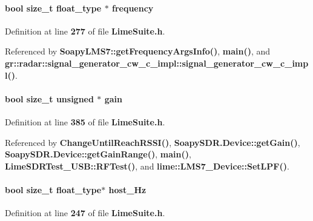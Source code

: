 \paragraph[{frequency}]{\setlength{\rightskip}{0pt plus 5cm}bool size\+\_\+t {\bf float\+\_\+type} $\ast$ frequency}\label{group__FN__HIGH__LVL_ga0d6d2a17845b8d678835c742f5eb6ac4}


Definition at line {\bf 277} of file {\bf Lime\+Suite.\+h}.



Referenced by {\bf Soapy\+L\+M\+S7\+::get\+Frequency\+Args\+Info()}, {\bf main()}, and {\bf gr\+::radar\+::signal\+\_\+generator\+\_\+cw\+\_\+c\+\_\+impl\+::signal\+\_\+generator\+\_\+cw\+\_\+c\+\_\+impl()}.

\paragraph[{gain}]{\setlength{\rightskip}{0pt plus 5cm}bool size\+\_\+t unsigned $\ast$ gain}\label{group__FN__HIGH__LVL_ga1275acc2013b13f44e8d43fcde951ef1}


Definition at line {\bf 385} of file {\bf Lime\+Suite.\+h}.



Referenced by {\bf Change\+Until\+Reach\+R\+S\+S\+I()}, {\bf Soapy\+S\+D\+R.\+Device\+::get\+Gain()}, {\bf Soapy\+S\+D\+R.\+Device\+::get\+Gain\+Range()}, {\bf main()}, {\bf Lime\+S\+D\+R\+Test\+\_\+\+U\+S\+B\+::\+R\+F\+Test()}, and {\bf lime\+::\+L\+M\+S7\+\_\+\+Device\+::\+Set\+L\+P\+F()}.

\paragraph[{host\+\_\+\+Hz}]{\setlength{\rightskip}{0pt plus 5cm}bool size\+\_\+t {\bf float\+\_\+type}$\ast$ host\+\_\+\+Hz}\label{group__FN__HIGH__LVL_gaaa9184e2d61bf9dd267f76bb5db90d50}


Definition at line {\bf 247} of file {\bf Lime\+Suite.\+h}.

